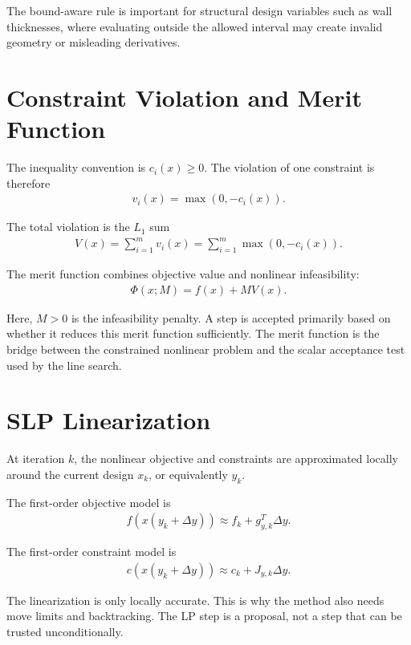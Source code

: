 \documentclass[11pt,a4paper]{article}
\begin{document}
The bound-aware rule is important for structural design variables such as wall
thicknesses, where evaluating outside the allowed interval may create invalid
geometry or misleading derivatives.

\section{Constraint Violation and Merit Function}

The inequality convention is \(c_i(x) \geq 0\). The violation of one constraint
is therefore
\begin{align}
    v_i(x) = \max(0, -c_i(x)).
\end{align}

The total violation is the \(L_1\) sum
\begin{align}
    V(x) = \sum_{i=1}^{m} v_i(x)
         = \sum_{i=1}^{m} \max(0, -c_i(x)).
\end{align}

The merit function combines objective value and nonlinear infeasibility:
\begin{align}
    \Phi(x; M) = f(x) + M V(x).
\end{align}

Here, \(M > 0\) is the infeasibility penalty. A step is accepted primarily based
on whether it reduces this merit function sufficiently. The merit function is
the bridge between the constrained nonlinear problem and the scalar acceptance
test used by the line search.

\section{SLP Linearization}

At iteration \(k\), the nonlinear objective and constraints are approximated
locally around the current design \(x_k\), or equivalently \(y_k\).

The first-order objective model is
\begin{align}
    f(x(y_k + \Delta y))
    \approx
    f_k + g_{y,k}^T \Delta y.
\end{align}

The first-order constraint model is
\begin{align}
    c(x(y_k + \Delta y))
    \approx
    c_k + J_{y,k} \Delta y.
\end{align}

The linearization is only locally accurate. This is why the method also needs
move limits and backtracking. The LP step is a proposal, not a step that can be
trusted unconditionally.
\end{document}
